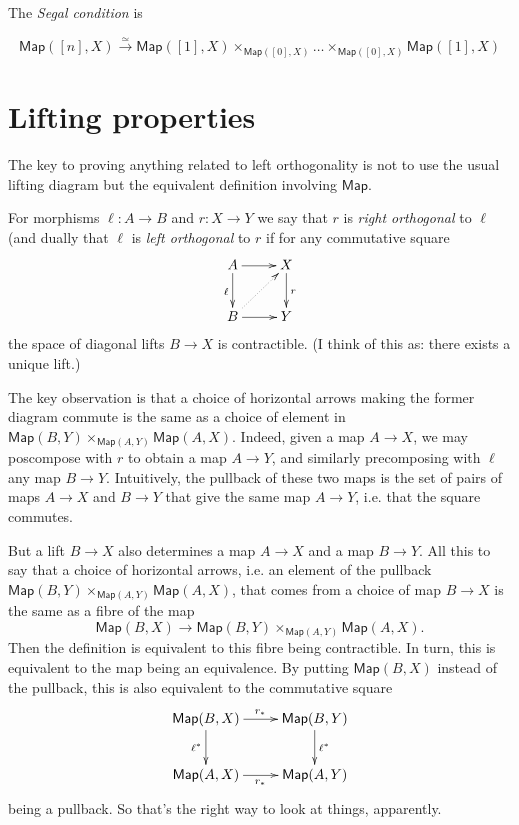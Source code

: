 The {\it Segal condition} is

$$
\mathsf{Map}([n],X) \xrightarrow{\simeq}
\mathsf{Map}([1],X)
\times_{\mathsf{Map}([0],X)}\ldots
\times_{\mathsf{Map}([0],X)}\mathsf{Map}([1],
X)
$$

\section{Lifting properties}
\label{section-lifting-properties}

The key to proving anything related
to left orthogonality is not to use
the usual lifting diagram but
the equivalent definition involving
$\mathsf{Map}$.

\begin{definition}
\label{definition-orthogonal}
For morphisms $\ell:A \to B$ and $r:X \to Y$
we say that $r$ is {\it right orthogonal}
to $\ell$ (and dually that $\ell$ is
{\it left orthogonal} to  $r$ if
for any commutative square
$$
\xymatrix{
A\ar[r]\ar[d]_{\ell}&X\ar[d]^{r}\\
B\ar@{.>}[ur]\ar[r]&Y
}
$$
the space of diagonal lifts $B \to X$ is
contractible.
(I think of this as: there exists a unique
lift.)
\end{definition}

\noindent
The key observation is that
a choice of horizontal arrows making the
former
diagram commute is the same as a choice of
element in
$\mathsf{Map}(B,Y)\times_{\mathsf{Map}(A,Y)}
\mathsf{Map}(A,X)$.
Indeed, given a map $A\to X$,
we may poscompose with $r$ to obtain
a map $A \to Y$, and similarly precomposing
with
$\ell$ any map $B \to Y$.
Intuitively, the pullback
of these two maps is the set of pairs
of maps $A \to X$ and $B \to Y$
that give the same map  $A \to Y$,
i.e. that the square commutes.

But a lift $B \to X$ also determines
a map $A \to X$ and
a map $B \to Y$.
All this to say that
a choice of horizontal arrows,
i.e. an element of the pullback
$\mathsf{Map}(B,Y)
\times_{\mathsf{Map}(A,Y)}\mathsf{Map}(A,X)$,
that comes from a choice of map
$B \to X$ is the same as
a fibre of the map
$$
\mathsf{Map}(B,X) \to
\mathsf{Map}(B,Y)
\times_{\mathsf{Map}(A,Y)}\mathsf{Map}(A,X).
$$
Then the definition is equivalent
to this fibre being contractible.
In turn, this is equivalent to the
map being an equivalence.
By putting $\mathsf{Map}(B,X)$ instead
of the pullback, this is also equivalent
to the commutative square
$$
\xymatrix{
\mathsf{Map}(B,X)\ar[r]^{r_*}\ar[d]_{\ell^*}&
\mathsf{Map}(B,Y)\ar[d]^{\ell^*}\\
\mathsf{Map}(A,X)\ar[r]_{r_*}&\mathsf{Map}(A,
Y)
}
$$
being a pullback. So that's the
right way to look at things, apparently.


